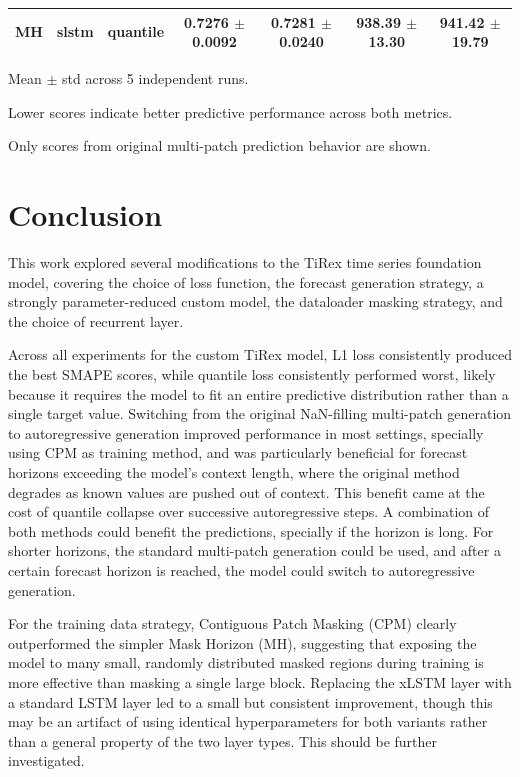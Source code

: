 \documentclass[a4paper,oneside,10pt,ngerman,english]{scrartcl}
\begin{document}
\begin{table}[htbp]
\begin{threeparttable}
\begin{tabular}{lllcccc}
			MH & slstm & quantile & \cellcolor[HTML]{fdfebc}0.7276 $\pm$ 0.0092 & 0.7281 $\pm$ 0.0240 & \cellcolor[HTML]{fdfebc}938.39 $\pm$ 13.30 & 941.42 $\pm$ 19.79 \\
			\bottomrule
		\end{tabular}
		\begin{tablenotes}
			\small
			\item[a] Mean $\pm$ std across 5 independent runs.
			\item[b] Lower scores indicate better predictive performance across both metrics.
			\item[c] Only scores from original multi-patch prediction behavior are shown.
		\end{tablenotes}	
	\end{threeparttable}
\end{table}


\section{Conclusion}
\label{sec:conclusion}
This work explored several modifications to the TiRex time series foundation model, covering the choice of loss function, the forecast generation strategy, a strongly parameter-reduced custom model, the dataloader masking strategy, and the choice of recurrent layer.

Across all experiments for the custom TiRex model, L1 loss consistently produced the best SMAPE scores, while quantile loss consistently performed worst, likely because it requires the model to fit an entire predictive distribution rather than a single target value. Switching from the original NaN-filling multi-patch generation to autoregressive generation improved performance in most settings, specially using CPM as training method, and was particularly beneficial for forecast horizons exceeding the model's context length, where the original method degrades as known values are pushed out of context. This benefit came at the cost of quantile collapse over successive autoregressive steps. A combination of both methods could benefit the predictions, specially if the horizon is long. For shorter horizons, the standard multi-patch generation could be used, and after a certain forecast horizon is reached, the model could switch to autoregressive generation.

For the training data strategy, Contiguous Patch Masking (CPM) clearly outperformed the simpler Mask Horizon (MH), suggesting that exposing the model to many small, randomly distributed masked regions during training is more effective than masking a single large block. Replacing the xLSTM layer with a standard LSTM layer led to a small but consistent improvement, though this may be an artifact of using identical hyperparameters for both variants rather than a general property of the two layer types. This should be further investigated.
\end{document}
